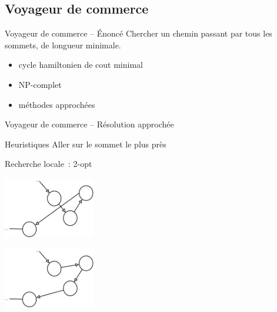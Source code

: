 \documentclass{beamer}
\begin{document}
\subsection{Voyageur de commerce}
\begin{frame}{Voyageur de commerce -- Énoncé}
    Chercher un chemin passant par tous les sommets, de longueur minimale.
    \begin{itemize}
        \item cycle hamiltonien de cout minimal
        \item NP-complet
        \item méthodes approchées
    \end{itemize}
\end{frame}

\begin{frame}{Voyageur de commerce -- Résolution approchée}
    \begin{block}{Heuristiques}
        Aller sur le sommet le plus près
    \end{block}

    \begin{block}{Recherche locale~: 2-opt}
      \centering
      \begin{multicols}{2}
        \includegraphics[width=0.3\textwidth]{../rapport/graphes/2opt1.png}

        \includegraphics[width=0.3\textwidth]{../rapport/graphes/2opt2.png}
      \end{multicols}
    \end{block}
\end{frame}
\end{document}
